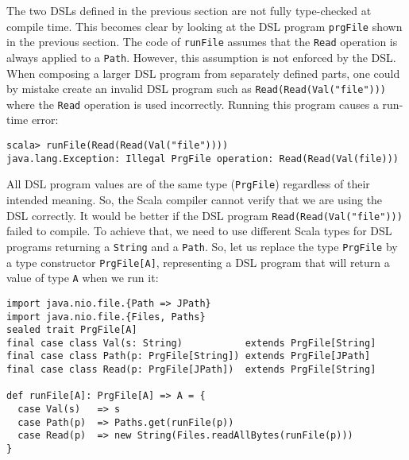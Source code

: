 The two DSLs defined in the previous section are not fully type-checked
at compile time. This becomes clear by looking at the DSL program
\lstinline!prgFile! shown
in the previous section. The code of \lstinline!runFile!
assumes that the \lstinline!Read!
operation is always applied to a \lstinline!Path!.
However, this assumption is not enforced by the DSL. When composing
a larger DSL program from separately defined parts, one could by mistake
create an invalid DSL program such as \lstinline!Read(Read(Val("file")))!
where the \lstinline!Read!
operation is used incorrectly. Running this program causes a run-time
error:
\begin{lstlisting}
scala> runFile(Read(Read(Val("file"))))
java.lang.Exception: Illegal PrgFile operation: Read(Read(Val(file)))
\end{lstlisting}
All DSL program values are of the same type (\lstinline!PrgFile!)
regardless of their intended meaning. So, the Scala compiler cannot
verify that we are using the DSL correctly. It would be better if
the DSL program \lstinline!Read(Read(Val("file")))!
failed to compile. To achieve that, we need to use different Scala
types for DSL programs returning a \lstinline!String!
and a \lstinline!Path!.
So, let us replace the type \lstinline!PrgFile!
by a type constructor \lstinline!PrgFile[A]!,
representing a DSL program that will return a value of type \lstinline!A!
when we run it:
\begin{lstlisting}
import java.nio.file.{Path => JPath}
import java.nio.file.{Files, Paths}
sealed trait PrgFile[A]
final case class Val(s: String)           extends PrgFile[String]
final case class Path(p: PrgFile[String]) extends PrgFile[JPath]
final case class Read(p: PrgFile[JPath])  extends PrgFile[String]

def runFile[A]: PrgFile[A] => A = {
  case Val(s)   => s
  case Path(p)  => Paths.get(runFile(p))
  case Read(p)  => new String(Files.readAllBytes(runFile(p)))
}
\end{lstlisting}
